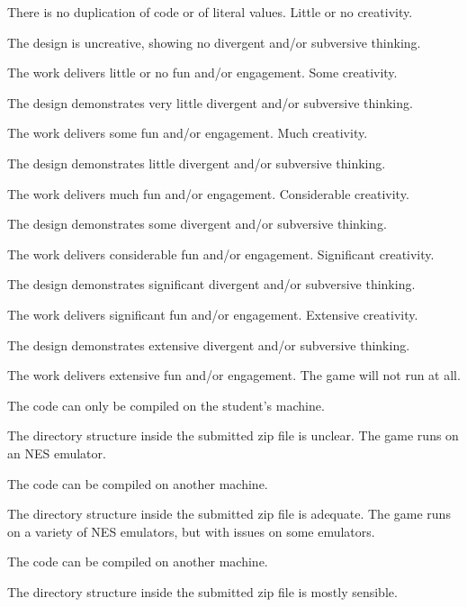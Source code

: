 \documentclass{../../fal_assignment}
\begin{document}
\begin{markingrubric}
            \par There is no duplication of code or of literal values.
%
        \grade\fail Little or no creativity.
            \par The design is uncreative, showing no divergent and/or subversive thinking.
            \par The work delivers little or no fun and/or engagement.
        \grade Some creativity.
            \par The design demonstrates very little divergent and/or subversive thinking.
            \par The work delivers some fun and/or engagement.
        \grade Much creativity.
            \par The design demonstrates little divergent and/or subversive thinking.
            \par The work delivers much fun and/or engagement.
        \grade Considerable creativity.
            \par The design demonstrates some divergent and/or subversive thinking.
            \par The work delivers considerable fun and/or engagement.
        \grade Significant creativity.
            \par The design demonstrates significant divergent and/or subversive thinking.
            \par The work delivers significant fun and/or engagement.
        \grade Extensive creativity.
            \par The design demonstrates extensive divergent and/or subversive thinking.
            \par The work delivers extensive fun and/or engagement.
%
        \grade\fail The game will not run at all.
        	\par The code can only be compiled on the student's machine.
            \par The directory structure inside the submitted zip file is unclear.
        \grade The game runs on an NES emulator.
        	\par The code can be compiled on another machine.
            \par The directory structure inside the submitted zip file is adequate.
        \grade The game runs on a variety of NES emulators, but with issues on some emulators.
        	\par The code can be compiled on another machine.
            \par The directory structure inside the submitted zip file is mostly sensible.

\end{markingrubric}
\end{document}
